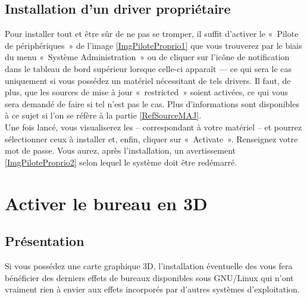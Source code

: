 \subsection{Installation d'un driver propriétaire}
\label{RefInstallDriverProprietaire}
Pour installer tout   et être sûr de ne pas se tromper, il suffit d'activer le «~Pilote de périphériques~» de l'image \ref{ImgPiloteProprio1} que vous trouverez par le biais du menu «~Système \FlecheDroite Administration~» ou de cliquer sur l'icône de notification dans le tableau de bord supérieur lorsque celle-ci apparaît --- ce qui sera le cas uniquement si vous possédez un matériel nécessitant de tels drivers. Il faut, de plus, que les sources de mise à jour «~restricted~» soient activées, ce qui vous sera demandé de faire si tel n'est pas le cas. Plus d'informations sont disponibles à ce sujet si l'on se réfère à la partie \ref{RefSourceMAJ}.\\
Une fois lancé, vous visualiserez les   -- correspondant à votre matériel -- et pourrez sélectionner ceux à installer et, enfin, cliquer sur «~Activate~». Renseignez votre mot de passe. Vous aurez, après l'installation, un avertissement \ref{ImgPiloteProprio2} selon lequel le système doit être redémarré.
\PiloteProprio
\section{Activer le bureau en 3D}
\label{RefBureau3D}
\subsection{Présentation}
Si vous possédez une carte graphique 3D, l'installation éventuelle  des   vous fera bénéficier des derniers effets de bureaux disponibles sous GNU/Linux qui n'ont vraiment rien à envier aux effets incorporés par d'autres systèmes d'exploitation.\par
